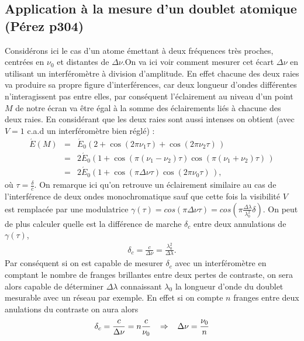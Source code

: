 \documentclass[12pt,prb,aps,epsf]{report}
\begin{document}
\subsection{Application à la mesure d'un doublet atomique (Pérez p304)} 
Considérons ici le cas d'un atome émettant à deux fréquences très proches, centrées en $\nu_0$ et distantes de $\Delta\nu$.On va ici voir comment mesurer cet écart $\Delta\nu$ en utilisant un interféromètre à division d'amplitude. En effet chacune des deux raies va produire sa propre figure d'interférences, car deux longueur d'ondes différentes n'interagissent pas entre elles, par conséquent l'éclairement au niveau d'un point $M$ de notre écran va être égal à la somme des éclairements liés à chacune des deux raies. En considérant que les deux raies sont aussi intenses on obtient (avec $V=1$ c.a.d un interféromètre bien réglé) :
\begin{eqnarray}
\acute{E}(M) &=& \acute{E}_0\left(2+\cos\left(2\pi\nu_1\tau \right) + \cos\left(2\pi\nu_2\tau\right)\,\right)\\
&=& 2\acute{E}_0 \left(1+\cos(\pi(\nu_1-\nu_2)\tau)\cos(\pi(\nu_1+\nu_2)\tau)\,\right)\\
&=& 2\acute{E}_0 \left(1+\cos(\pi\Delta\nu\tau)\cos(2\pi\nu_0\tau)\,\right),
\end{eqnarray}
où $\tau=\frac{\delta}{c}$. On remarque ici qu'on retrouve un éclairement similaire au cas de l'interférence de deux ondes monochromatique sauf que cette fois la visibilité $V$ est remplacée par une modulatrice $\gamma(\tau)=cos(\pi\Delta\nu\tau)=cos(\pi\frac{\Delta\lambda}{\lambda_0^2}\delta)$. On peut de plus calculer quelle est la différence de marche $\delta_c$ entre deux annulations de $\gamma(\tau)$,
\begin{eqnarray}
\delta_c = \frac{c}{\Delta\nu} = \frac{\lambda_0^2}{\Delta\lambda}.
\end{eqnarray}
Par conséquent si on est capable de mesurer $\delta_c$ avec un interféromètre en comptant le nombre de franges brillantes entre deux pertes de contraste, on sera alors capable de déterminer $\Delta\lambda$ connaissant $\lambda_0$ la longueur d'onde du doublet mesurable avec un réseau par exemple. En effet si on compte $n$ franges entre deux anulations du contraste on aura alors 
\begin{eqnarray}
\delta_c = \frac{c}{\Delta\nu} = n\frac{c}{\nu_0} \hspace{0.3cm}\Rightarrow\hspace{0.3cm} \Delta\nu = \frac{\nu_0}{n}
\end{eqnarray}
\end{document}
